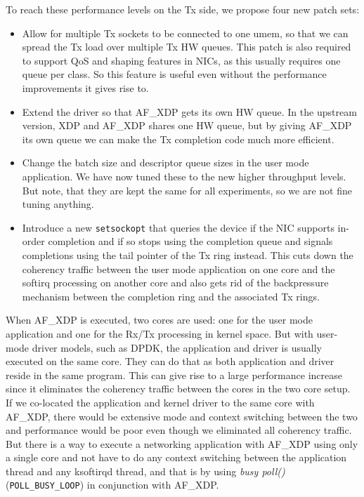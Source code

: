 \documentclass[9pt,numbers,reprint]{sigplanconf}
\begin{document}
To reach these performance levels on the Tx side, we propose four new
patch sets:
\begin{itemize}

\item Allow for multiple Tx sockets to be connected to one umem, so
  that we can spread the Tx load over multiple Tx HW queues. This
  patch is also required to support QoS and shaping features in NICs,
  as this usually requires one queue per class. So this feature is
  useful even without the performance improvements it gives rise to.

\item Extend the driver so that AF\_XDP gets its own HW queue. In the
  upstream version, XDP and AF\_XDP shares one HW queue, but by
  giving AF\_XDP its own queue we can make the Tx completion code much
  more efficient.

\item Change the batch size and descriptor queue sizes in the user mode
  application. We have now tuned these to the new higher throughput
  levels. But note, that they are kept the same for all experiments,
  so we are not fine tuning anything.

\item Introduce a new {\tt setsockopt} that queries the device if the NIC
  supports in-order completion and if so stops using the completion
  queue and signals completions using the tail pointer of the Tx ring
  instead. This cuts down the coherency traffic between the user mode
  application on one core and the softirq processing on another core
  and also gets rid of the backpressure mechanism between the
  completion ring and the associated Tx rings.

\end{itemize}

When AF\_XDP is executed, two cores are used: one for the user mode
application and one for the Rx/Tx processing in kernel space. But with
user-mode driver models, such as DPDK, the application and driver is
usually executed on the same core. They can do that as both
application and driver reside in the same program. This can give rise
to a large performance increase since it eliminates the coherency
traffic between the cores in the two core setup. If we co-located the
application and kernel driver to the same core with AF\_XDP, there
would be extensive mode and context switching between the two and
performance would be poor even though we eliminated all coherency
traffic. But there is a way to execute a networking application with
AF\_XDP using only a single core and not have to do any context switching
between the application thread and any ksoftirqd thread, and that is
by using \emph{busy poll()}~\cite{busy_poll} ({\tt POLL\_BUSY\_LOOP}) in
conjunction with AF\_XDP.
\end{document}
